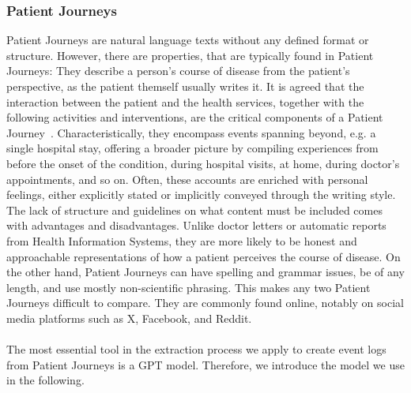 \subsubsection*{Patient Journeys}\label{sec:pj}
Patient Journeys are natural language texts without any defined format or structure. However, there are properties, that are typically found in Patient Journeys: They describe a person's course of disease from the patient's perspective, as the patient themself usually writes it. It is agreed that the interaction between the patient and the health services, together with the following activities and interventions, are the critical components of a Patient Journey~\cite{ferrara_engaging_2019, kuo_rosacea_2015}. Characteristically, they encompass events spanning beyond, e.g. a single hospital stay, offering a broader picture by compiling experiences from before the onset of the condition, during hospital visits, at home, during doctor's appointments, and so on. Often, these accounts are enriched with personal feelings, either explicitly stated or implicitly conveyed through the writing style. The lack of structure and guidelines on what content must be included comes with advantages and disadvantages. Unlike doctor letters or automatic reports from Health Information Systems, they are more likely to be honest and approachable representations of how a patient perceives the course of disease.
On the other hand, Patient Journeys can have spelling and grammar issues, be of any length, and use mostly non-scientific phrasing. This makes any two Patient Journeys difficult to compare. They are commonly found online, notably on social media platforms such as X, Facebook, and Reddit.\\\\
The most essential tool in the extraction process we apply to create event logs from Patient Journeys is a GPT model. Therefore, we introduce the model we use in the following.


